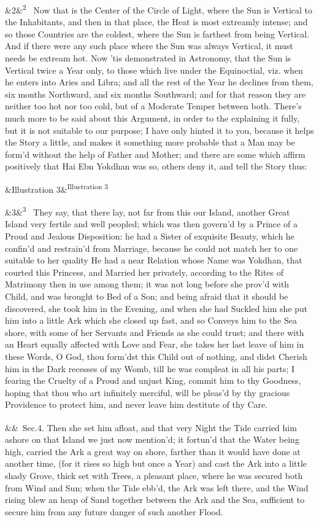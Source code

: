 \documentclass[12pt]{article}
\newcommand{\para}[1][]{\par\noindent\ifx&#1&\else\textsuperscript{\footnotesize #1}~\fi}
\begin{document}
\para[2] Now that is the Center of the Circle of Light, where the Sun is Vertical to the Inhabitants, and then in that place, the Heat is most extreamly intense; and so those Countries are the coldest, where the Sun is farthest from being Vertical. And if there were any such place where the Sun was always Vertical, it must needs be extream hot. Now 'tis demonstrated in Astronomy, that the Sun is Vertical twice a Year only, to those which live under the Equinoctial, viz. when he enters into Aries and Libra; and all the rest of the Year he declines from them, six months Northward, and six months Southward; and for that reason they are neither too hot nor too cold, but of a Moderate Temper between both. There's much more to be said about this Argument, in order to the explaining it fully, but it is not suitable to our purpose; I have only hinted it to you, because it helps the Story a little, and makes it something more probable that a Man may be form'd without the help of Father and Mother; and there are some which affirm positively that Hai Ebn Yokdhan was so, others deny it, and tell the Story thus:

\para [Illustration 3]

\para[3] They say, that there lay, not far from this our Island, another Great Island very fertile and well peopled; which was then govern'd by a Prince of a Proud and Jealous Disposition: he had a Sister of exquisite Beauty, which he confin'd and restrain'd from Marriage, because he could not match her to one suitable to her quality He had a near Relation whose Name was Yokdhan, that courted this Princess, and Married her privately, according to the Rites of Matrimony then in use among them; it was not long before she prov'd with Child, and was brought to Bed of a Son; and being afraid that it should be discovered, she took him in the Evening, and when she had Suckled him she put him into a little Ark which she closed up fast, and so Conveys him to the Sea shore, with some of her Servants and Friends as she could trust; and there with an Heart equally affected with Love and Fear, she takes her last leave of him in these Words, O God, thou form'dst this Child out of nothing, and didst Cherish him in the Dark recesses of my Womb, till he was compleat in all his parts; I fearing the Cruelty of a Proud and unjust King, commit him to thy Goodness, hoping that thou who art infinitely merciful, will be pleas'd by thy gracious Providence to protect him, and never leave him destitute of thy Care.

\para Sec.4. Then she set him afloat, and that very Night the Tide carried him ashore on that Island we just now mention'd; it fortun'd that the Water being high, carried the Ark a great way on shore, farther than it would have done at another time, (for it rises so high but once a Year) and cast the Ark into a little shady Grove, thick set with Trees, a pleasant place, where he was secured both from Wind and Sun; when the Tide ebb'd, the Ark was left there, and the Wind rising blew an heap of Sand together between the Ark and the Sea, sufficient to secure him from any future danger of such another Flood.
\end{document}
